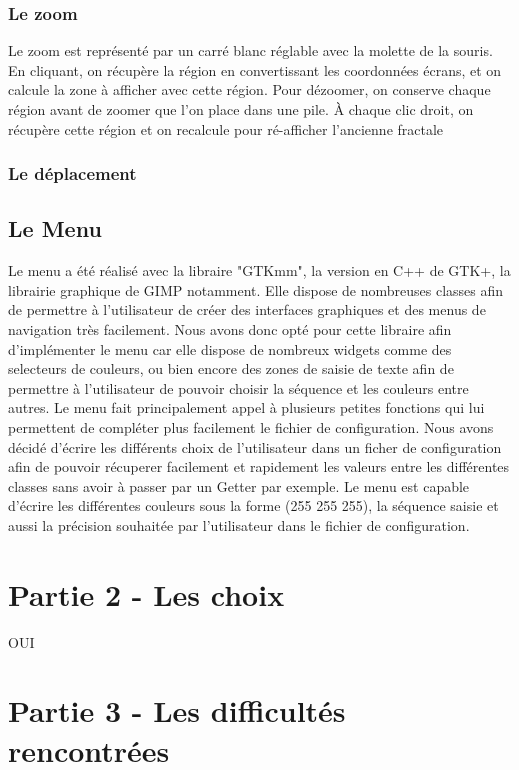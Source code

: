 \documentclass{article}
\begin{document}
    \subsubsection*{Le zoom}

    Le zoom est représenté par un carré blanc réglable avec la molette de la souris.
    En cliquant, on récupère la région en convertissant les coordonnées écrans, et on calcule la zone à afficher avec cette région.
    Pour dézoomer, on conserve chaque région avant de zoomer que l'on place dans une pile.
    À chaque clic droit, on récupère cette région et on recalcule pour ré-afficher l'ancienne fractale

    \subsubsection*{Le déplacement}

    \subsection*{Le Menu}
    Le menu a été réalisé avec la libraire "GTKmm", la version en C++ de GTK+, la librairie graphique de GIMP notamment.
    Elle dispose de nombreuses classes afin de permettre à l'utilisateur de créer des interfaces graphiques et des menus de navigation très facilement.
    Nous avons donc opté pour cette libraire afin d'implémenter le menu car elle dispose de nombreux widgets comme des selecteurs de couleurs, ou bien encore des zones de saisie de texte afin de permettre à l'utilisateur de pouvoir choisir la séquence et les couleurs entre autres.
    Le menu fait principalement appel à plusieurs petites fonctions qui lui permettent de compléter plus facilement le fichier de configuration.
    Nous avons décidé d'écrire les différents choix de l'utilisateur dans un ficher de configuration afin de pouvoir récuperer facilement et rapidement les valeurs entre les différentes classes sans avoir à passer par un Getter par exemple.
    Le menu est capable d'écrire les différentes couleurs sous la forme (255 255 255), la séquence saisie et aussi la précision souhaitée par l'utilisateur dans le fichier de configuration.

\section* {Partie 2 - Les choix}
OUI

\section* {Partie 3 - Les difficultés rencontrées}
\end{document}
